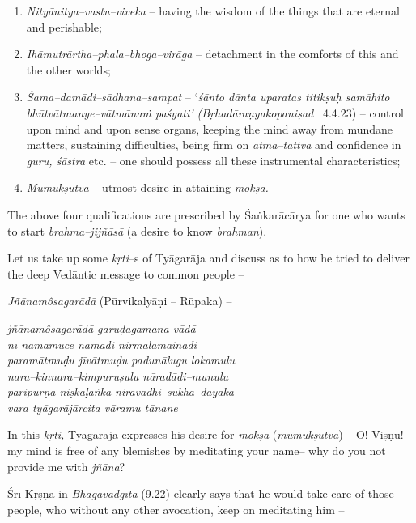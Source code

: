 \begin{enumerate}
\item \textit{Nityānitya–vastu–viveka} – having the wisdom of the things that are eternal and perishable;
 
\item \textit{Ihāmutrārtha–phala–bhoga–virāga} – detachment in the comforts of this and the other worlds;
 
\item \textit{Śama–damādi–sādhana–sampat} – ‘\textit{śānto dānta uparatas titikṣuḥ samāhito bhūtvātmanye–vātmānaṁ paśyati’ (Bṛhadāraṇyakopaniṣad}  4.4.23) – control upon mind and upon sense organs, keeping the mind away from mundane matters, sustaining difficulties, being firm on \textit{ātma–tattva} and confidence in \textit{guru, śāstra} etc. – one should possess all these instrumental characteristics;
 
\item \textit{Mumukṣutva} – utmost desire in attaining \textit{mokṣa.}
 
\end{enumerate}

The above four qualifications are prescribed by Śaṅkarācārya for one who wants to start \textit{brahma–jijñāsā} (a desire to know \textit{brahman}).

Let us take up some \textit{kṛti}–s of Tyāgarāja and discuss as to how he tried to deliver the deep Vedāntic message to common people –

\textit{Jñānamôsagarādā} (Pūrvikalyāṇi – Rūpaka) –

\begin{myquote}
\textit{jñānamôsagarādā garuḍagamana vādā} \\\textit{nī nāmamuce nāmadi nirmalamainadi} \\\textit{paramātmuḍu jīvātmuḍu padunālugu lokamulu}\\\textit{nara–kinnara–kimpuruṣulu nāradādi–munulu}\\\textit{paripūrṇa niṣkaḷaṅka niravadhi–sukha–dāyaka}\\\textit{vara tyāgarājārcita vāramu tānane}
\end{myquote}

In this \textit{kṛti,} Tyāgarāja expresses his desire for \textit{mokṣa} (\textit{mumukṣutva}) – O! Viṣṇu! my mind is free of any blemishes by meditating your name– why do you not provide me with \textit{jñāna}?

Śrī Kṛṣṇa in \textit{Bhagavadgītā} (9.22) clearly says that he would take care of those people, who without any other avocation, keep on meditating him –

